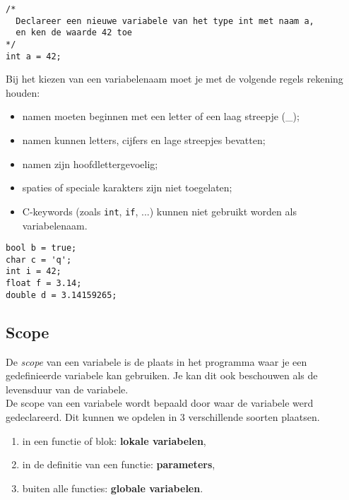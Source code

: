 \documentclass[11pt,fleqn]{book} %
\def\Cpp{{C\nolinebreak[4]\hspace{-.05em}\raisebox{.4ex}{\tiny\bf ++}}}
\begin{document}
\begin{example}
	\phantom{ }
	\begin{verbatim}
/*
  Declareer een nieuwe variabele van het type int met naam a, 
  en ken de waarde 42 toe
*/
int a = 42;
	\end{verbatim}
\end{example}

\noindent Bij het kiezen van een variabelenaam moet je met de volgende regels rekening houden:
\begin{itemize}
	\item namen moeten beginnen met een letter of een laag streepje (\_);
	\item namen kunnen letters, cijfers en lage streepjes bevatten;
	\item namen zijn hoofdlettergevoelig;
	\item spaties of speciale karakters zijn niet toegelaten;
	\item \Cpp{}-keywords (zoals \texttt{int}, \texttt{if}, ...) kunnen niet gebruikt worden als variabelenaam.
\end{itemize}

\begin{example}
	\phantom{ }
	\begin{verbatim}
bool b = true;
char c = 'q';
int i = 42;
float f = 3.14;
double d = 3.14159265;
	\end{verbatim}
\end{example}

\subsection{Scope}
De \emph{scope} van een variabele is de plaats in het programma waar je een gedefinieerde variabele kan gebruiken. Je kan dit ook beschouwen als de levensduur van de variabele.\\

\noindent
De scope van een variabele wordt bepaald door waar de variabele werd gedeclareerd. Dit kunnen we opdelen in 3 verschillende soorten plaatsen.

\begin{enumerate}
	\item in een functie of blok: \textbf{lokale variabelen},
	\item in de definitie van een functie: \textbf{parameters},
	\item buiten alle functies: \textbf{globale variabelen}.
\end{enumerate}
\end{document}
